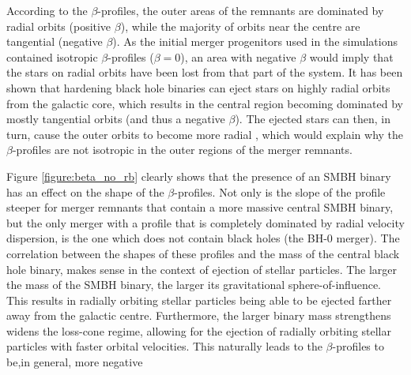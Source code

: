 \documentclass[english, twoside]{HYgradu}
\begin{document}
According to the $\beta$-profiles, the outer areas of the remnants are dominated by radial orbits (positive $\beta$), while the majority of orbits near the centre are tangential (negative $\beta$). As the initial merger progenitors used in the simulations contained isotropic $\beta$-profiles ($\beta = 0$), an area with negative $\beta$ would imply that the stars on radial orbits have been lost from that part of the system. It has been shown that hardening black hole binaries can eject stars on highly radial orbits from the galactic core, which results in the central region becoming dominated by mostly tangential orbits (and thus a negative $\beta$). The ejected stars can then, in turn, cause the outer orbits to become more radial \citep{Quinlan1997, Milosavljevic2001, Thomas2014}, which would explain why the $\beta$-profiles are not isotropic in the outer regions of the merger remnants.

Figure \ref{figure:beta_no_rb} clearly shows that the presence of an SMBH binary has an effect on the shape of the $\beta$-profiles. Not only is the slope of the profile steeper for merger remnants that contain a more massive central SMBH binary, but the only merger with a profile that is completely dominated by radial velocity dispersion, is the one which does not contain black holes (the BH-0 merger). The correlation between the shapes of these profiles and the mass of the central black hole binary, makes sense in the context of ejection of stellar particles. The larger the mass of the SMBH binary, the larger its gravitational sphere-of-influence. This results in radially orbiting stellar particles being able to be ejected farther away from the galactic centre. Furthermore, the larger binary mass strengthens widens the loss-cone regime, allowing for the ejection of radially orbiting stellar particles with faster orbital velocities. This naturally leads to the $\beta$-profiles to be,in general, more negative
\end{document}
